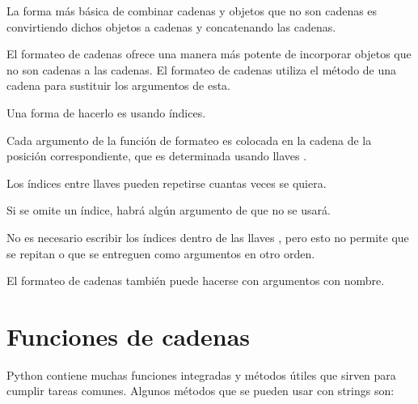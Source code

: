 La forma más básica de combinar cadenas y objetos que no son cadenas es convirtiendo dichos objetos a cadenas y concatenando las cadenas.

El formateo de cadenas ofrece una manera más potente de incorporar objetos que no son cadenas a las cadenas.
El formateo de cadenas utiliza el método  de una cadena para sustituir los argumentos de esta.

Una forma de hacerlo es usando índices.


Cada argumento de la función de formateo es colocada en la cadena de la posición correspondiente, que es determinada usando llaves \ttt{\{\}}.

Los índices entre llaves \ttt{\{\}} pueden repetirse cuantas veces se quiera.


Si se omite un índice, habrá algún argumento de  que no se usará.


No es necesario escribir los índices dentro de las llaves \ttt{\{\}}, pero esto no permite que se repitan o que se entreguen como argumentos en otro orden.


El formateo de cadenas también puede hacerse con argumentos con nombre.


\section{Funciones de cadenas}

Python contiene muchas funciones integradas y métodos útiles que sirven para cumplir tareas comunes.
Algunos métodos que se pueden usar con strings son:

